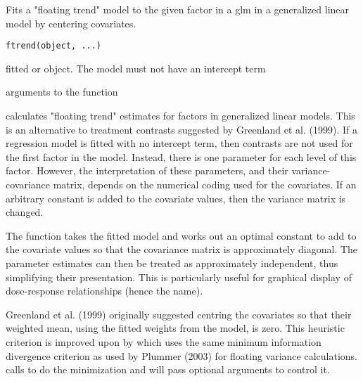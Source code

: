 \begin{Description}\relax
Fits a "floating trend" model to the given factor in a glm in a generalized
linear model by centering covariates.
\end{Description}
\begin{Usage}
\begin{verbatim}
ftrend(object, ...)
\end{verbatim}
\end{Usage}
\begin{Arguments}
\begin{ldescription}
\item[\code{object}] fitted  or  object. The model must not have an intercept term
\item[\code{...}] arguments to the  function
\end{ldescription}
\end{Arguments}
\begin{Details}\relax
{} calculates "floating trend" estimates for factors in
generalized linear models.  This is an alternative to treatment
contrasts suggested by Greenland et al. (1999).  If a regression model
is fitted with no intercept term, then contrasts are  not used for the
first factor in the model. Instead, there is one parameter  for each
level of this factor.  However, the interpretation of these
parameters,  and their variance-covariance matrix, depends on the
numerical coding used for the  covariates. If an arbitrary constant is
added to the covariate values, then   the variance matrix is changed. 

The  function takes the fitted model and works out an optimal 
constant to add to the covariate values so that the covariance matrix is
approximately diagonal.  The parameter estimates can then be treated as
approximately independent, thus simplifying their presentation. This is
particularly useful for graphical display of dose-response relationships
(hence the name).

Greenland et al. (1999) originally suggested centring the covariates so that
their weighted mean, using the fitted weights from the model, is zero.  This
heuristic criterion is improved upon by  which uses the same 
minimum information divergence criterion as used by Plummer (2003) for
floating variance calculations.  calls  to
do the minimization and will pass optional arguments to control it.
\end{Details}
